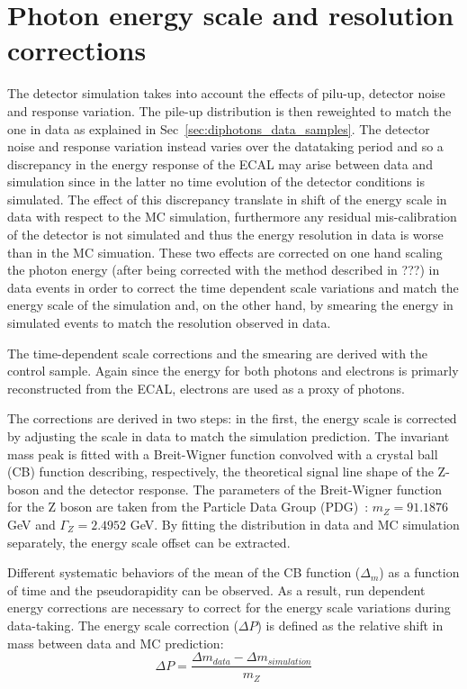 \section{Photon energy scale and resolution corrections}
\label{sec:dipho_energy}
The detector simulation takes into account the effects of pilu-up, detector noise and response variation.
The pile-up distribution is then reweighted to match the one in data as explained in Sec~\ref{sec:diphotons_data_samples}.
The detector noise and response variation instead varies over the datataking period and so a discrepancy
in the energy response of the ECAL may arise between data and simulation since in the latter no time evolution
of the detector conditions is simulated. The effect of this discrepancy translate in shift of the energy
scale in data with respect to the MC simulation, furthermore any residual mis-calibration of the detector
is not simulated and thus the energy resolution in data is worse than in the MC simuation.
These two effects are corrected on one hand
scaling the photon energy (after being corrected with the method described in ???) in data events
in order to correct the time dependent scale variations and match the energy scale of the simulation and,
on the other hand, by smearing the energy in simulated events to match the resolution observed in data.

The time-dependent scale corrections and the smearing are derived with the \Zee control sample.
Again since the energy for both photons and electrons is primarly reconstructed from the ECAL, electrons
are used as a proxy of photons.

The corrections are derived in two steps: in the first, the energy scale is corrected by
adjusting the scale in data to match the simulation prediction. The \Zee invariant mass peak is fitted with
a Breit-Wigner function convolved with a crystal ball (CB) function describing, respectively,
the theoretical signal line shape of the Z-boson and the detector response.
The parameters of the Breit-Wigner function for the Z boson are taken from the Particle
Data Group (PDG)~\cite{PDG}: $m_Z = 91.1876$ GeV and $\Gamma_Z = 2.4952$ GeV.
By fitting the distribution in data and MC simulation separately, the energy scale offset can be extracted.

Different systematic behaviors of the mean of the CB function ($\Delta_m$) as a function of time and the
pseudorapidity can be observed. As a result, run dependent energy corrections are
necessary to correct for the energy scale variations during data-taking. The energy scale
correction ($\Delta P$) is defined as the relative shift in mass between data and MC prediction:
\[
  \Delta P = \frac{\Delta m_{data} - \Delta m_{simulation}}{m_Z}
\]


